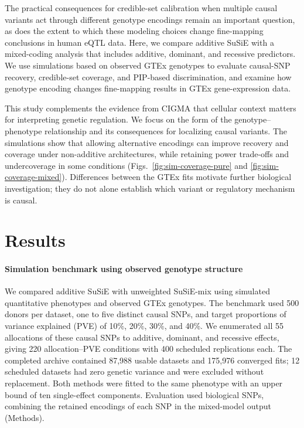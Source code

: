 \documentclass[12pt]{article}
\begin{document}
The practical consequences for credible-set calibration when multiple
causal variants act through different genotype encodings remain an
important question, as does the extent to which these modeling choices
change fine-mapping conclusions in human eQTL data. Here, we compare
additive SuSiE with a mixed-coding analysis that includes additive,
dominant, and recessive predictors. We use simulations based on observed
GTEx genotypes to evaluate causal-SNP recovery, credible-set coverage,
and PIP-based discrimination, and examine how genotype encoding changes
fine-mapping results in GTEx gene-expression data.

This study complements the evidence from CIGMA that cellular context
matters for interpreting genetic regulation. We focus on the form of
the genotype--phenotype relationship and its consequences for localizing
causal variants. The simulations show that allowing alternative
encodings can improve recovery and coverage under non-additive
architectures, while retaining power trade-offs and undercoverage in
some conditions (Figs.~\ref{fig:sim-coverage-pure} and
\ref{fig:sim-coverage-mixed}). Differences between the GTEx fits motivate
further biological investigation; they do not alone establish which
variant or regulatory mechanism is causal.

\section{Results}

\paragraph{Simulation benchmark using observed genotype structure}

We compared additive SuSiE with unweighted SuSiE-mix using simulated
quantitative phenotypes and observed GTEx genotypes. The benchmark used
500 donors per dataset, one to five distinct causal SNPs, and target
proportions of variance explained (PVE) of 10\%, 20\%, 30\%, and 40\%.
We enumerated all 55 allocations of these causal SNPs to additive,
dominant, and recessive effects, giving 220 allocation--PVE conditions
with 400 scheduled replications each. The completed archive contained
87,988 usable datasets and 175,976 converged fits; 12 scheduled datasets
had zero genetic variance and were excluded without replacement.
Both methods were fitted to the same phenotype with an upper bound of
ten single-effect components. Evaluation used biological SNPs, combining
the retained encodings of each SNP in the mixed-model output (Methods).
\end{document}
